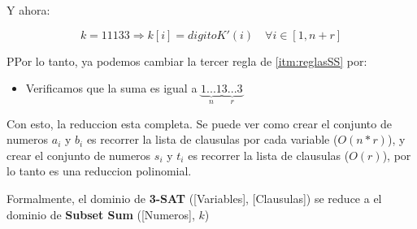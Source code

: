 Y ahora: 

\[
    k = 11133 \Rightarrow k[i] = digitoK'(i) \quad \forall i \in [1, n + r]
\]

PPor lo tanto, ya podemos cambiar la tercer regla de \ref{itm:reglasSS} por:
\begin{itemize}
  \item Verificamos que la suma es igual a 
    $\underbrace{1...1}_{n}\underbrace{3...3}_{r}$
\end{itemize}

Con esto, la reduccion esta completa. 
Se puede ver como crear el conjunto de numeros $a_i$ y $b_i$ es recorrer la lista 
de clausulas por cada variable ($O(n*r)$), y crear el conjunto de numeros 
$s_i$ y $t_i$ es recorrer la lista de clausulas ($O(r)$), por lo tanto es 
una reduccion polinomial.

Formalmente, el dominio de \textbf{3-SAT} ([Variables], [Clausulas]) se reduce 
a el dominio de \textbf{Subset Sum} ([Numeros], $k$)
